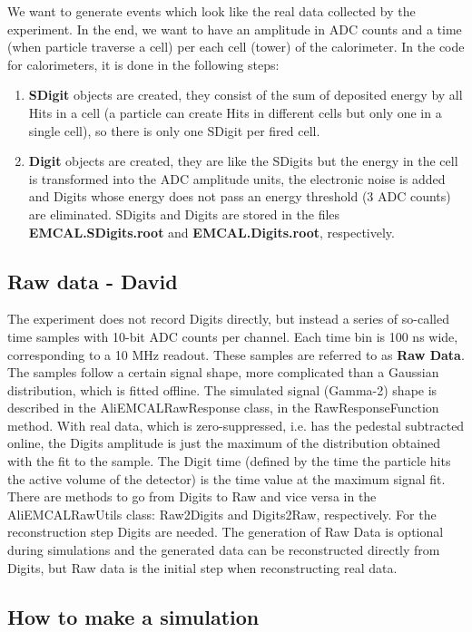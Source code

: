 We want to generate events which look like the real data collected
by the experiment. In the end, we want to have an amplitude in ADC
counts and a time (when particle traverse a cell) per each cell (tower)
of the calorimeter. In the code for calorimeters, it is done in the
following steps: 
\begin{enumerate}
\item \textbf{SDigit} objects are created, they consist
of the sum of deposited energy by all Hits in a cell (a particle can
create Hits in different cells but only one in a single cell), so
there is only one SDigit per fired cell.
\item \textbf{Digit} objects are created, they are like the SDigits but the energy in the cell
is transformed into the ADC amplitude units, the electronic noise
is added and Digits whose energy does not pass an energy threshold
(3 ADC counts) are eliminated. SDigits and Digits are stored in the files
\textbf{EMCAL.SDigits.root} and \textbf{EMCAL.Digits.root}, respectively.
\end{enumerate}

\subsection{Raw data - David \label{sec:simu_raw}}

The experiment does not record Digits directly, but instead a series of so-called
time samples with 10-bit ADC counts per channel. Each time bin is 100 ns
wide, corresponding to a 10 MHz readout.
These samples are referred to as
\textbf{Raw Data}. The samples follow a certain signal shape, more complicated than
a Gaussian distribution, which is fitted offline. 
The simulated signal (Gamma-2) shape is described in the AliEMCALRawResponse class,
in the RawResponseFunction method.
With real data, which is zero-suppressed, i.e. has the pedestal subtracted online, the
Digits amplitude is just the maximum of the distribution obtained
with the fit to the sample. The Digit time (defined by the time the
particle hits the active volume of the detector) is the time value at
the maximum signal fit. There are methods to go from Digits to
Raw and vice versa in the AliEMCALRawUtils class: Raw2Digits and Digits2Raw,
respectively. For the reconstruction step Digits are needed. The
generation of Raw Data is optional during simulations and the generated 
data can be reconstructed directly from Digits, but Raw data is the initial
step when reconstructing real data.


\subsection{How to make a simulation\label{sec:simu_steps}}

